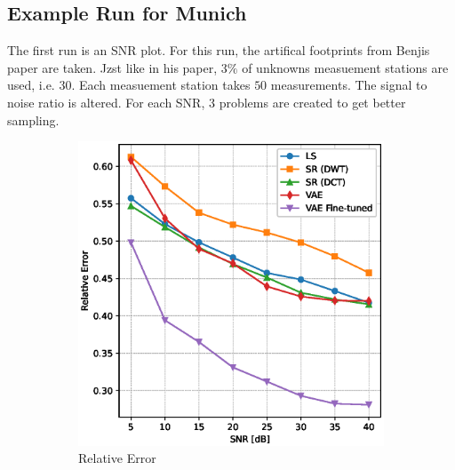 \subsection{Example Run for Munich}
The first run is an SNR plot.
For this run, the artifical footprints from Benjis paper are taken.
Jzst like in his paper, $3\%$ of unknowns measuement stations are used, i.e. 30.
Each measuement station takes $50$ measurements.
The signal to noise ratio is altered.
For each SNR, 3 problems are created to get better sampling.
\begin{figure}
    \centering
    \begin{subfigure}[b]{0.49\textwidth}
        \includegraphics[width=\textwidth]{figures/06_results/snr_plots/munich_relative_error.eps}
        \caption{Relative Error}
    \end{subfigure}
    \begin{subfigure}[b]{0.49\textwidth}

\end{subfigure}
\end{figure}
